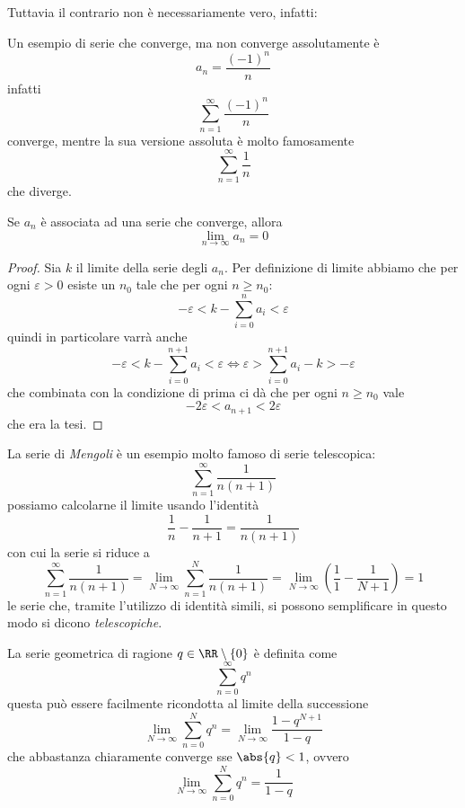\documentclass[11pt]{scrartcl}
\begin{document}
	Tuttavia il contrario non è necessariamente vero, infatti:
	\begin{example}
		Un esempio di serie che converge, ma non converge assolutamente è
		$$a_n=\frac{(-1)^n}{n}$$
		infatti 
		$$\sum_{n=1}^{\infty}\frac{(-1)^n}{n}$$
		converge, mentre la sua versione assoluta è molto famosamente
		$$\sum_{n=1}^{\infty}\frac{1}{n}$$
		che diverge.
	\end{example}
	\begin{lemma}\label{serie:Una serie convergente è una successione infinitesima}
		Se $a_n$ è associata ad una serie che converge, allora
		$$\lim_{n\to\infty}a_n=0$$
	\end{lemma}
	\begin{proof}
		Sia $k$ il limite della serie degli $a_n$. Per definizione di limite abbiamo che per ogni $\varepsilon>0$ esiste un $n_0$ tale che per ogni $n\ge n_0$:
		$$-\varepsilon<k-\sum_{i=0}^{n}a_i<\varepsilon$$
		quindi in particolare varrà anche
		$$-\varepsilon<k-\sum_{i=0}^{n+1}a_i<\varepsilon \iff \varepsilon>\sum_{i=0}^{n+1}a_i-k>-\varepsilon$$
		che combinata con la condizione di prima ci dà che per ogni $n\ge n_0$ vale
		$$-2\varepsilon < a_{n+1}<2\varepsilon$$
		che era la tesi.
	\end{proof}
	\begin{example}
		La serie di \textit{Mengoli} è un esempio molto famoso di serie telescopica:
		$$\sum_{n=1}^{\infty}\frac{1}{n(n+1)}$$
		possiamo calcolarne il limite usando l'identità
		$$\frac{1}{n}-\frac{1}{n+1}=\frac{1}{n(n+1)}$$
		con cui la serie si riduce a 
		$$\sum_{n=1}^{\infty}\frac{1}{n(n+1)}=\lim_{N\to\infty}\sum_{n=1}^{N}\frac{1}{n(n+1)}=\lim_{N\to\infty}\left(\frac{1}{1}-\frac{1}{N+1}\right)=1$$
		le serie che, tramite l'utilizzo di identità simili, si possono semplificare in questo modo si dicono \textit{telescopiche}.
	\end{example}
	\begin{example}
		La serie geometrica di ragione $q\in\RR\setminus\left\{0\right\}$ è definita come
		$$\sum_{n=0}^{\infty}q^n$$
		questa può essere facilmente ricondotta al limite della successione
		$$\lim_{N\to\infty}\sum_{n=0}^{N}q^n=\lim_{N\to\infty}\frac{1-q^{N+1}}{1-q}$$
		che abbastanza chiaramente converge sse $\abs{q}<1$, ovvero
		$$\lim_{N\to\infty}\sum_{n=0}^{N}q^n=\frac{1}{1-q}$$
	\end{example}
	
	\newpage
	
\end{document}
